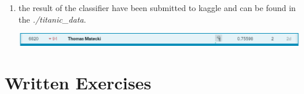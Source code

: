 \documentclass{report}
\begin{document}
\begin{enumerate}
\begin{enumerate}[label=(\alph*)]
\begin{itemize}
		\end{itemize}
		\item the result of the classifier have been submitted to kaggle and can be found in the \textit{./titanic\_data}. 
		\begin{center}
		\includegraphics[width=16cm]{images/titanic_kaggle.png}
		\end{center}
	\end{enumerate}
	
\end{enumerate}

\section*{Written Exercises}	
\end{document}
